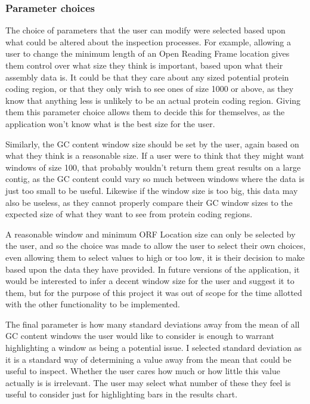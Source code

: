 \subsubsection{Parameter choices}
The choice of parameters that the user can modify were selected based upon what could be altered about the inspection processes. For example, allowing a user to change the minimum length of an Open Reading Frame location gives them control over what size they think is important, based upon what their assembly data is. It could be that they care about any sized potential protein coding region, or that they only wish to see ones of size 1000 or above, as they know that anything less is unlikely to be an actual protein coding region. Giving them this parameter choice allows them to decide this for themselves, as the application won't know what is the best size for the user.

Similarly, the GC content window size should be set by the user, again based on what they think is a reasonable size. If a user were to think that they might want windows of size 100, that probably wouldn't return them great results on a large contig, as the GC content could vary so much between windows where the data is just too small to be useful. Likewise if the window size is too big, this data may also be useless, as they cannot properly compare their GC window sizes to the expected size of what they want to see from protein coding regions.

A reasonable window and minimum ORF Location size can only be selected by the user, and so the choice was made to allow the user to select their own choices, even allowing them to select values to high or too low, it is their decision to make based upon the data they have provided. In future versions of the application, it would be interested to infer a decent window size for the user and suggest it to them, but for the purpose of this project it was out of scope for the time allotted with the other functionality to be implemented.

The final parameter is how many standard deviations away from the mean of all GC content windows the user would like to consider is enough to warrant highlighting a window as being a potential issue. I selected standard deviation as it is a standard way of determining a value away from the mean that could be useful to inspect. Whether the user cares how much or how little this value actually is is irrelevant. The user may select what number of these they feel is useful to consider just for highlighting bars in the results chart.

